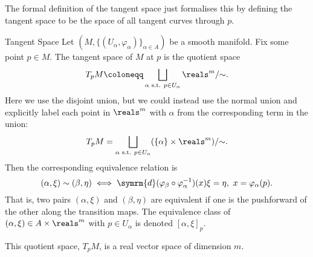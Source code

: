 \documentclass[fleqn]{NotesClass}
\renewcommand{\dl}{\symrm{d}}
\begin{document}
    The formal definition of the tangent space just formalises this by defining the tangent space to be the space of all tangent curves through \(p\).
    
    \begin{dfn}{Tangent Space}{}
        Let \((M, \{(U_\alpha, \varphi_\alpha)\}_{\alpha \in A})\) be a smooth manifold.
        Fix some point \(p \in M\).
        The tangent space of \(M\) at \(p\) is the quotient space
        \begin{equation}
            T_pM \coloneqq \bigsqcup_{\alpha \text{ s.t. }p \in U_\alpha} \reals^m / {\sim}.
        \end{equation}
        Here we use the disjoint union, but we could instead use the normal union and explicitly label each point in \(\reals^m\) with \(\alpha\) from the corresponding term in the union:
        \begin{equation}
            T_pM = \bigsqcup_{\alpha \text{ s.t. } p \in U_\alpha} (\{\alpha\} \times \reals^m)/{\sim}.
        \end{equation}
        Then the corresponding equivalence relation is
        \begin{equation}
            (\alpha, \xi) \sim (\beta, \eta) \iff \dl(\varphi_\beta \circ \varphi_\alpha^{-1})(x)\xi = \eta, \ x = \varphi_\alpha(p).
        \end{equation}
        That is, two pairs \((\alpha, \xi)\) and \((\beta, \eta)\) are equivalent if one is the pushforward of the other along the transition maps.
        The equivalence class of \((\alpha, \xi) \in A \times \reals^m\) with \(p \in U_\alpha\) is denoted \([\alpha, \xi]_p\).
    \end{dfn}
    
    This quotient space, \(T_pM\), is a real vector space of dimension \(m\).

%        
%
\end{document}
